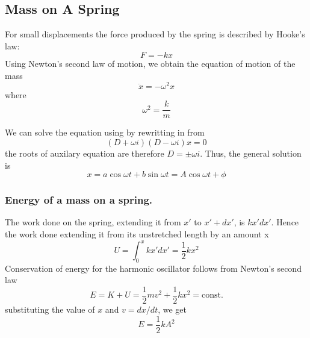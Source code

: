 \documentclass[../main.tex]{subfiles}
\begin{document}
\subsection*{Mass on A Spring}
For small displacements the force produced by the spring is described by Hooke's law:
\begin{equation*}
    F = -kx 
\end{equation*}
Using Newton's second law of motion, we obtain the equation of motion of the mass
\begin{equation*}
   \ddot{x}=-\omega^2 x
\end{equation*}
where\begin{equation*}
    \omega^2=\frac{k}{m}
\end{equation*}

We can solve the equation using by rewritting in from
\begin{equation*}
    (D+\omega i)(D-\omega i)x=0
\end{equation*}
the roots of auxilary equation are therefore $D=\pm \omega i$. Thus, the general solution is
\begin{equation*}
    x=a\cos \omega t+ b \sin \omega t= A\cos \omega t +\phi
\end{equation*}

\subsubsection*{Energy of a mass on a spring.} The work done on the spring, extending it from $x'$ to $ x' + dx'$, is $kx'dx'$. Hence the work done extending it from its unstretched length by an amount x
\begin{equation*}
    U=\int_{0}^{x}kx'dx'= \frac{1}{2} kx^2
\end{equation*}
Conservation of energy for the harmonic oscillator follows from Newton's second law
\begin{equation*}
    E=K+U=\frac{1}{2}mv^2+\frac{1}{2}kx^2=\text{const.}
\end{equation*}
substituting the value of $x$ and $v=dx/dt$, we get
\begin{equation*}
    E=\frac{1}{2}kA^2
\end{equation*}
\end{document}
